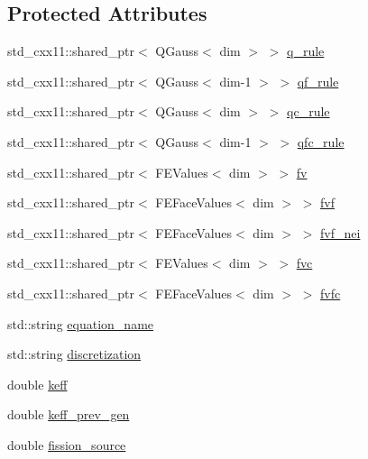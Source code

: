 \subsection*{Protected Attributes}
\begin{DoxyCompactItemize}
\item 
std\+\_\+cxx11\+::shared\+\_\+ptr$<$ Q\+Gauss$<$ dim $>$ $>$ \hyperlink{class_equation_base_a5e677b436f1abeeeffc3da284e5c1c4c}{q\+\_\+rule}
\item 
std\+\_\+cxx11\+::shared\+\_\+ptr$<$ Q\+Gauss$<$ dim-\/1 $>$ $>$ \hyperlink{class_equation_base_ab4c9256889d7f5a6b7d4295c81b9193b}{qf\+\_\+rule}
\item 
std\+\_\+cxx11\+::shared\+\_\+ptr$<$ Q\+Gauss$<$ dim $>$ $>$ \hyperlink{class_equation_base_a306b0c876f50b5eb936e5bf71ebcd988}{qc\+\_\+rule}
\item 
std\+\_\+cxx11\+::shared\+\_\+ptr$<$ Q\+Gauss$<$ dim-\/1 $>$ $>$ \hyperlink{class_equation_base_a867f14c44c6132bd65542e9cdcf264c4}{qfc\+\_\+rule}
\item 
std\+\_\+cxx11\+::shared\+\_\+ptr$<$ F\+E\+Values$<$ dim $>$ $>$ \hyperlink{class_equation_base_abf3c19880eaea0911fff9eb7f3b4b425}{fv}
\item 
std\+\_\+cxx11\+::shared\+\_\+ptr$<$ F\+E\+Face\+Values$<$ dim $>$ $>$ \hyperlink{class_equation_base_a80b624dc27281e2758918d83fd38daf4}{fvf}
\item 
std\+\_\+cxx11\+::shared\+\_\+ptr$<$ F\+E\+Face\+Values$<$ dim $>$ $>$ \hyperlink{class_equation_base_abd53ef2bf719d3f8e72881072383180c}{fvf\+\_\+nei}
\item 
std\+\_\+cxx11\+::shared\+\_\+ptr$<$ F\+E\+Values$<$ dim $>$ $>$ \hyperlink{class_equation_base_a04c2626e352fcc6b1c24c50a7e899c2f}{fvc}
\item 
std\+\_\+cxx11\+::shared\+\_\+ptr$<$ F\+E\+Face\+Values$<$ dim $>$ $>$ \hyperlink{class_equation_base_a6f6ca8b0e78bcbe0edd07f7967a0a6f9}{fvfc}
\item 
std\+::string \hyperlink{class_equation_base_a0a72472959e531f5256400dec911f3a5}{equation\+\_\+name}
\item 
std\+::string \hyperlink{class_equation_base_adf124367d26087d33b6f252aa3cdd0a3}{discretization}
\item 
double \hyperlink{class_equation_base_ab3cf94dc329f486555f89bdb0dd94ed6}{keff}
\item 
double \hyperlink{class_equation_base_a80de7bca9496a5739f842ed154ecd274}{keff\+\_\+prev\+\_\+gen}
\item 
double \hyperlink{class_equation_base_aec6881c5aa66a28deab370236219f569}{fission\+\_\+source}

\end{DoxyCompactItemize}
